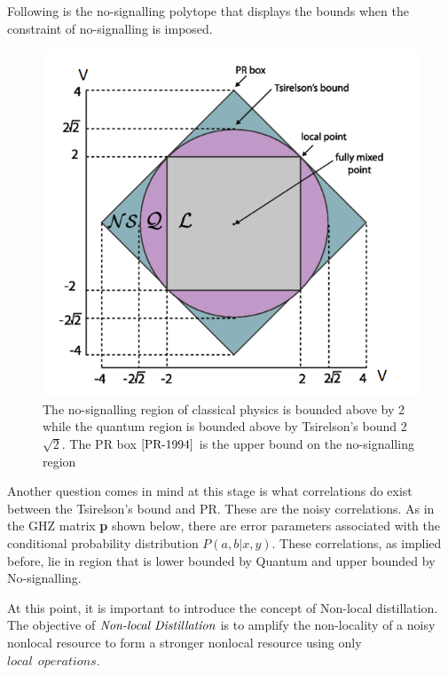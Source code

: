 \documentclass[aps,prl,twocolumn,groupedaddress]{revtex4}
\begin{document}
Following is the no-signalling polytope that displays the bounds when the constraint of no-signalling is imposed. 

\begin{figure}[t]
\includegraphics[scale=0.6]{no-signal.png}   
\caption[The no-signalling region of classical physics is bounded above by 2 while the quantum region is bounded above by Tsirelson's bound 2$\sqrt{2}$. The PR box $\cite{PR-1994}$ is the upper bound on the no-signalling region]{The no-signalling region of classical physics is bounded above by 2 while the quantum region is bounded above by Tsirelson's bound 2$\sqrt{2}$. The PR box $\cite{PR-1994}$ is the upper bound on the no-signalling region}
\label{figure:generic}
\end{figure}

Another question comes in mind at this stage is what correlations do exist between the Tsirelson's bound and PR. These are the noisy correlations. As in the GHZ matrix \textbf{p} shown below, there are error parameters associated with the conditional probability distribution $P(a,b|x,y)$. These correlations, as implied before, lie in region that is lower bounded by Quantum and upper bounded by No-signalling. 

At this point, it is important to introduce the concept of Non-local distillation. The objective of $\emph{Non-local Distillation}$ is to amplify the non-locality of a noisy nonlocal resource to form a stronger nonlocal resource using only $local~~operations$.  
\end{document}
